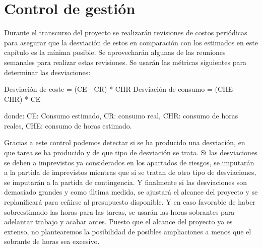 \section{Control de gestión}
Durante el transcurso del proyecto se realizarán revisiones de costos periódicas para asegurar que la desviación de estos en comparación con los estimados en este capítulo es la mínima posible. Se aprovecharán algunas de las reuniones semanales para realizar estas revisiones. Se usarán las métricas siguientes para determinar las desviaciones:

Desviación de coste = (CE - CR) * CHR  
Desviación de consumo = (CHE - CHR) * CE  

donde: CE: Consumo estimado, CR: consumo real, CHR: consumo de horas reales, CHE: consumo de horas estimado.  

Gracias a este control podemos detectar si se ha producido una desviación, en que tarea se ha producido y de que tipo de desviación se trata. Si las desviaciones se deben a imprevistos ya considerados en los apartados de riesgos, se imputarán a la partida de imprevistos mientras que si se tratan de otro tipo de desviaciones, se imputarán a la partida de contingencia. Y finalmente si las desviaciones son demasiado grandes y como última medida, se ajustará el alcance del proyecto y se replanificará para ceñirse al presupuesto disponible. Y en caso favorable de haber sobreestimado las horas para las tareas, se usarán las horas sobrantes para adelantar trabajo y acabar antes. Puesto que el alcance del proyecto ya es extenso, no plantearemos la posibilidad de posibles ampliaciones a menos que el sobrante de horas sea excesivo.